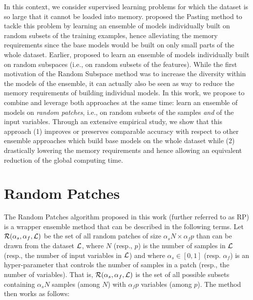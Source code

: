 In this context, we consider supervised learning problems for which the dataset
is so large that it cannot be loaded into memory.
\citet{breiman:1999} proposed the Pasting method to tackle this problem by learning an
ensemble of models individually built on random subsets of the training
examples, hence alleviating the memory requirements since the base models would
be built on only small parts of the whole dataset. Earlier, \citet{ho:1998} proposed
to learn an ensemble of models individually built on random
subspaces (i.e., on random subsets of the features). While the first motivation
of the Random Subspace method was to increase the diversity within the models
of the ensemble, it can actually also be seen as way to reduce the memory
requirements of building individual models. In this work, we propose to combine
and leverage both approaches at the same time: learn an ensemble of models on
\textit{random patches}, i.e., on random subsets of the samples \textit{and} of
the input variables. Through an extensive empirical study, we show that this
approach (1) improves or preserves comparable accuracy with respect to other
ensemble approaches which build base models on the whole dataset while (2)
drastically lowering the memory requirements and hence allowing an equivalent
reduction of the global computing time.

\section{Random Patches}
\label{sec:9:rp}

The Random Patches algorithm proposed in this work (further referred to as RP)
is a wrapper ensemble method that can be described in the following terms. Let
${\cal R}(\alpha_s, \alpha_f, {\cal L})$ be the set of all random patches of
size $\alpha_s N \times \alpha_f p$ than can be drawn from the dataset ${\cal
L}$, where $N$ (resp., $p$) is the number of samples in ${\cal L}$ (resp.,  the
number of input variables in ${\cal L}$) and where $\alpha_s \in [0, 1]$ (resp.
$\alpha_f$) is an hyper-parameter that controls the number of samples in a
patch (resp., the number of variables). That is, ${\cal R}(\alpha_s, \alpha_f,
{\cal L})$ is the set of all possible subsets containing $\alpha_s N$ samples
(among $N$) with $\alpha_f p$ variables (among $p$). The method then works as
follows:


